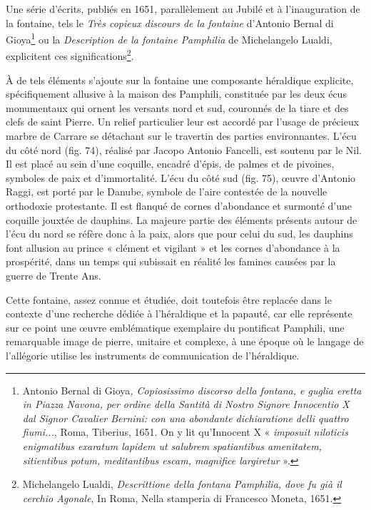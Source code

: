 \documentclass[12pt,twoside,openany]{book}
\begin{document}
Une série d’écrits, publiés en 1651, parallèlement au Jubilé et à l’inauguration de la fontaine, tels le \textit{Très copieux discours de la fontaine} d’Antonio Bernal di Gioya\footnote{Antonio Bernal di Gioya\textit{, Copiosissimo discorso della fontana, e guglia eretta in Piazza Navona, per ordine della Santità di Nostro Signore Innocentio X dal Signor Cavalier Bernini: con una abondante dichiaratione delli quattro fiumi...}, Roma, Tiberius, 1651. On y lit qu’Innocent X « \textit{imposuit niloticis enigmatibus exaratum lapidem ut salubrem spatiantibus amenitatem, sitientibus potum, meditantibus escam, magnifice largiretur} ».} ou la \textit{Description de la fontaine Pamphilia} de Michelangelo Lualdi, explicitent ces significations\footnote{Michelangelo Lualdi, \textit{Descrittione della fontana Pamphilia, dove fu già il cerchio Agonale}, In Roma, Nella stamperia di Francesco Moneta, 1651.}.

À de tels éléments s’ajoute sur la fontaine une composante héraldique explicite, spécifiquement allusive à la maison des Pamphili, constituée par les deux écus monumentaux qui ornent les versants nord et sud, couronnés de la tiare et des clefs de saint Pierre. Un relief particulier leur est accordé par l’usage de précieux marbre de Carrare se détachant sur le travertin des parties environnantes. L’écu du côté nord (fig. 74), réalisé par Jacopo Antonio Fancelli, est soutenu par le Nil. Il est placé au sein d’une coquille, encadré d’épis, de palmes et de pivoines, symboles de paix et d’immortalité. L’écu du côté sud (fig. 75), œuvre d’Antonio Raggi, est porté par le Danube, symbole de l’aire contestée de la nouvelle orthodoxie protestante. Il est flanqué de cornes d’abondance et surmonté d’une coquille jouxtée de dauphins. La majeure partie des éléments présents autour de l’écu du nord se réfère donc à la paix, alors que pour celui du sud, les dauphins font allusion au prince « clément et vigilant » et les cornes d’abondance à la prospérité, dans un temps qui subissait en réalité les famines causées par la guerre de Trente Ans.

Cette fontaine, assez connue et étudiée, doit toutefois être replacée dans le contexte d’une recherche dédiée à l’héraldique et la papauté, car elle représente sur ce point une œuvre emblématique exemplaire du pontificat Pamphili, une remarquable image de pierre, unitaire et complexe, à une époque où le langage de l’allégorie utilise les instruments de communication de l’héraldique.
\end{document}
